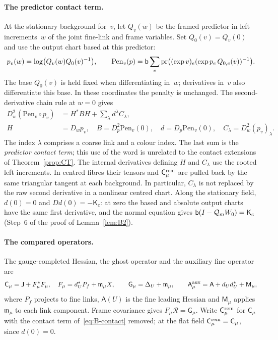 \paragraph{The predictor contact term.} At the stationary background for~$v$, let $Q_v(w)$ be the framed predictor in left increments~$w$ of the joint fine-link and frame variables. Set $Q_0(v)=Q_v(0)$ and use the output chart based at this predictor:
\begin{equation*}
p_v(w)=\log\bigl(Q_v(w)Q_0(v)^{-1}\bigr),\qquad
\mathrm{Pen}_v(p)=\mathsf{b}\sum_e\operatorname{pr}\bigl((\exp v)_e(\exp p_e\,Q_{0,e}(v))^{-1}\bigr).
\end{equation*}
The base $Q_0(v)$ is held fixed when differentiating in~$w$; derivatives in~$v$ also differentiate this base. In these coordinates the penalty is unchanged. The second-derivative chain rule at $w=0$ gives
\begin{equation}\label{eq:B-contact}
\begin{aligned}
D_w^2(\mathrm{Pen}_v\circ p_v)&=H^*BH+\sum_\lambda d^\lambda C_\lambda,\\
H&=D_wp_v,\quad B=D_p^2\mathrm{Pen}_v(0),\quad
d=D_p\mathrm{Pen}_v(0),\quad C_\lambda=D^2_w(p_v)_\lambda .
\end{aligned}
\end{equation}
The index $\lambda$ comprises a coarse link and a colour index. The last sum is the \emph{predictor contact term}; this use of the word is unrelated to the contact extensions of Theorem~\ref{prop:CT}. The internal derivatives defining $H$ and $C_\lambda$ use the rooted left increments. In centred fibres their tensors and $\mathsf C_\mu^{\rm rem}$ are pulled back by the same triangular tangent at each background. In particular, $C_\lambda$ is not replaced by the raw second derivative in a nonlinear centred chart. Along the stationary field, $d(0)=0$ and $Dd(0)=-\mathsf K_c$: at zero the based and absolute output charts have the same first derivative, and the normal equation gives $\mathsf{b}(I-\mathcal Q_mW_0)=\mathsf K_c$ (Step~6 of the proof of Lemma~\ref{lem:B2}).

\paragraph{The compared operators.} The gauge-completed Hessian, the ghost operator and the auxiliary fine operator are
\begin{equation*}
\mathsf C_\mu=\mathsf J+F_\mu^*F_\mu,\quad F_\mu=d_U^*P_f+\mathfrak m_\mu X,\qquad
\mathsf G_\mu=\Delta_U+\mathfrak m_\mu,\qquad
\mathsf A^{\rm aux}_\mu=\mathsf A+d_Ud_U^*+\mathsf M_\mu ,
\end{equation*}
where $P_f$ projects to fine links, $\mathsf A(U)$ is the fine leading Hessian and $\mathsf M_\mu$ applies $\mathfrak m_\mu$ to each link component. Frame covariance gives $F_\mu\mathcal R=\mathsf G_\mu$. Write $\mathsf C^{\rm rem}_\mu$ for $\mathsf C_\mu$ with the contact term of~\eqref{eq:B-contact} removed; at the flat field $\mathsf C^{\rm rem}_\mu=\mathsf C_\mu$, since $d(0)=0$.

